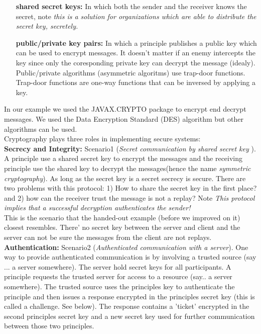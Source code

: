 \begin{itemize}
\item[  \textbf{shared secret keys:}] In which both the sender and the receiver knows the secret, note \textit{this is a solution for organizations which are able to distribute the secret key, secretely.}

\item[\textbf{public/private key pairs:}] In which a principle publishes a public key which can be used to encrypt messages. It doesn't matter if an enemy intercepts the key since only the coresponding private key can decrypt the message (idealy). Public/private algorithms (asymmetric algoritms) use trap-door functions. Trap-door functions are one-way functions that can be inversed by applying a key.  \\
\end{itemize}

In our example we used the JAVAX.CRYPTO package to encrypt end decrypt messages. We used the Data Encryption Standard (DES) algorithm but other algorithms can be used.\\

Cryptography plays three roles in implementing secure systems:\\

\textbf{Secrecy and Integrity:} Scenario1 (\textit{Secret communication by shared secret key }). A principle use a shared secret key to encrypt the messages and the receiving principle use the shared key to decrypt the messages(hence the name \textit{symmetric cryptography}). As long as the secret key is a secret secrecy is secure. There are two problems with this protocol: 1) How to share the secret key in the first place? and 2) how can the receiver trust the message is not a replay? Note \textit{This protocol implies that a successful decryption authenticates the sender!} \\

This is the scenario that the handed-out example (before we improved on it) closest resembles. There' no secret key between the server and client and the server can not be sure the messages from the client are not replays. \\

\textbf{Authentication:} Scenario2 (\textit{Authenticated communication with a server}). One way to provide authenticated communication is by involving a trusted source (say ... a server somewhere). The server hold secret keys for all participants. A principle requests the trusted server for access to a resource (say.. a server somewhere). The trusted source uses the principles key to authenticate the principle and then issues a response encrypted in the principles secret key (this is called a challenge. See below). The response contains a 'ticket' encrypted in the second principles secret key and a new secret key used for further communication between those two principles. \\ 


